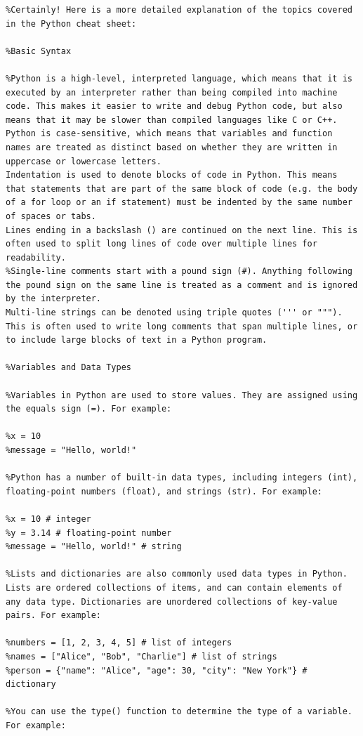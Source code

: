 \begin{lstlisting}
%Certainly! Here is a more detailed explanation of the topics covered in the Python cheat sheet:

%Basic Syntax

%Python is a high-level, interpreted language, which means that it is executed by an interpreter rather than being compiled into machine code. This makes it easier to write and debug Python code, but also means that it may be slower than compiled languages like C or C++.
Python is case-sensitive, which means that variables and function names are treated as distinct based on whether they are written in uppercase or lowercase letters.
Indentation is used to denote blocks of code in Python. This means that statements that are part of the same block of code (e.g. the body of a for loop or an if statement) must be indented by the same number of spaces or tabs.
Lines ending in a backslash () are continued on the next line. This is often used to split long lines of code over multiple lines for readability.
%Single-line comments start with a pound sign (#). Anything following the pound sign on the same line is treated as a comment and is ignored by the interpreter.
Multi-line strings can be denoted using triple quotes (''' or """). This is often used to write long comments that span multiple lines, or to include large blocks of text in a Python program.

%Variables and Data Types

%Variables in Python are used to store values. They are assigned using the equals sign (=). For example:

%x = 10
%message = "Hello, world!"

%Python has a number of built-in data types, including integers (int), floating-point numbers (float), and strings (str). For example:

%x = 10 # integer
%y = 3.14 # floating-point number
%message = "Hello, world!" # string

%Lists and dictionaries are also commonly used data types in Python. Lists are ordered collections of items, and can contain elements of any data type. Dictionaries are unordered collections of key-value pairs. For example:

%numbers = [1, 2, 3, 4, 5] # list of integers
%names = ["Alice", "Bob", "Charlie"] # list of strings
%person = {"name": "Alice", "age": 30, "city": "New York"} # dictionary

%You can use the type() function to determine the type of a variable. For example:


\end{lstlisting}
